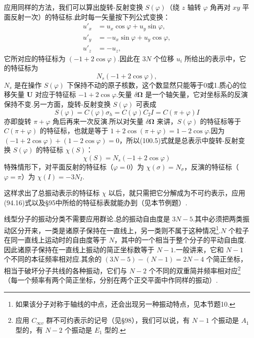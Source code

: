 应用同样的方法，我们可以算出旋转-反射变换 $S(\varphi)$（绕 $z$ 轴转 $\varphi$ 角再对 $xy$ 平面反射一次）的特征标.此时每一矢量按下列公式变换：
\begin{equation*}
\begin{aligned}
  u'_x&=u_x\cos\varphi+u_y\sin\varphi,\\
  u'_y&=-u_x\sin\varphi+u_y\cos\varphi,\\
  u'_z&=-u_z,
\end{aligned}
\end{equation*}
它所对应的特征标为 $(-1+2\cos\varphi)$.因此在 $3N$ 个位移 $u_i$ 所给出的表示中，它的特征标为
\begin{equation}
  N_s(-1+2\cos\varphi),
\end{equation}
$N_s$ 是在操作 $S(\varphi)$ 下保持不动的原子核数，这个数显然只能等于0或1.质心的位移矢量 $\boldsymbol{U}$ 对应于特征标 $-1+2\cos\varphi$.矢量 $\delta\boldsymbol{\Omega}$ 是一个轴矢量，它对坐标系的反演保持不变.另一方面，旋转-反射变换 $S(\varphi)$ 可表成
\begin{equation*}
  S(\varphi)=C(\varphi)\sigma_h=C(\varphi)C_2I=C(\pi+\varphi)I
\end{equation*}
亦即旋转 $\pi+\varphi$ 角后再来一次反演.所以对矢量 $\delta\boldsymbol{\Omega}$ 来讲，$S(\varphi)$ 的特征标等于 $C(\pi+\varphi)$ 的特征标，也就是等于 $1+2\cos(\pi+\varphi)=1-2\cos\varphi$.因为 $(-1+2\cos\varphi)+(1-2\cos\varphi)=0$，所以(100.5)式就是总表示中旋转-反射变换 $S(\varphi)$ 的特征标 $\chi(S)$：
\begin{equation}
  \chi(S)=N_s(-1+2\cos\varphi)
\end{equation}
特殊情形下，对平面反射的特征标（$\varphi=0$）为 $\chi(\sigma)=N_\sigma$，反演的特征标（$\varphi=\pi$）为 $\chi(I)=-3N_I$.

这样求出了总振动表示的特征标 $\chi$ 以后，就只需把它分解成为不可约表示，应用(94.16)式以及§95中所给的特征标表就能办到（见本节例题）.

线型分子的振动分类不需要应用群论.总的振动自由度是 $3N-5$.其中必须把两类振动区分开来，一类是诸原子保持在一直线上，另一类则不属于这种情况\footnote{如果该分子对称于轴线的中点，还会出现另一种振动特点，见本节题10.}.$N$ 个粒子在同一直线上运动时的自由度等于 $N$，其中的一个相当于整个分子的平动自由度.因此诸原子保持在一直线上振动的简正坐标数等于 $N-1$.一般讲来，它和 $N-1$ 个不同的本征频率相对应.其余的 $(3N-5)-(N-1)=2N-4$ 个简正坐标，相当于破坏分子共线的各种振动，它们与 $N-2$ 个不同的双重简并频率相对应\footnote{应用 $C_{\infty v}$ 群不可约表示的记号（见§98），我们可以说，有 $N-1$ 个振动是 $A_1$ 型的，有 $N-2$ 个振动是 $E_1$ 型的.}（每一个频率有两个简正坐标，分别在两个正交平面中作同样的振动）.

